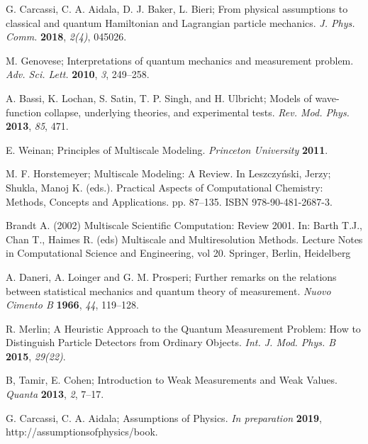 \documentclass[applsci,article,submit,moreauthors,pdftex]{Definitions/mdpi}
\begin{document}
\begin{thebibliography}{999}

G. Carcassi, C. A. Aidala, D. J. Baker, L. Bieri; From physical assumptions to classical and quantum {Hamiltonian} and {Lagrangian} particle mechanics. {\em J. Phys. Comm.} {\bf 2018}, {\em 2(4)}, 045026.

M. Genovese; Interpretations of quantum mechanics and measurement problem. {\em Adv. Sci. Lett.} {\bf 2010}, {\em 3}, 249--258.

A. Bassi, K. Lochan, S. Satin, T. P. Singh, and H. Ulbricht; Models of wave-function collapse, underlying theories, and experimental tests. {\em Rev. Mod. Phys.} {\bf 2013}, {\em 85}, 471.

E. Weinan; Principles of Multiscale Modeling. {\em Princeton University} {\bf 2011}.

M. F. Horstemeyer; Multiscale Modeling: A Review. In Leszczyński, Jerzy; Shukla, Manoj K. (eds.). Practical Aspects of Computational Chemistry: Methods, Concepts and Applications. pp. 87–135. ISBN 978-90-481-2687-3.

Brandt A. (2002) Multiscale Scientific Computation: Review 2001. In: Barth T.J., Chan T., Haimes R. (eds) Multiscale and Multiresolution Methods. Lecture Notes in Computational Science and Engineering, vol 20. Springer, Berlin, Heidelberg

A. Daneri, A. Loinger and G. M. Prosperi; Further remarks on the relations between statistical mechanics and quantum theory of measurement. {\em Nuovo Cimento B} {\bf 1966}, {\em 44}, 119--128.

R. Merlin; A Heuristic Approach to the Quantum Measurement Problem: How to Distinguish Particle Detectors from Ordinary Objects. {\em Int. J. Mod. Phys. B} {\bf 2015}, {\em 29(22)}.

B, Tamir, E. Cohen; Introduction to Weak Measurements and Weak Values. {\em Quanta} {\bf 2013}, {\em 2}, 7–17.

G. Carcassi, C. A. Aidala; Assumptions of Physics. {\em In preparation} {\bf 2019}, http://assumptionsofphysics/book.

\end{thebibliography}
\end{document}

